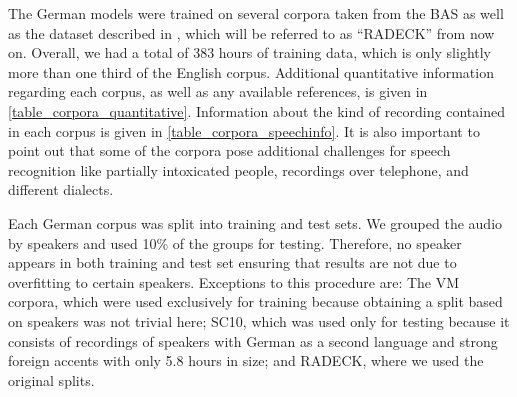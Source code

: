 \documentclass[11pt,a4paper]{article}
\begin{document}
The German models were trained on several corpora taken from the \ac{BAS} \cite{schiel_bas_1998, reichel_bas_2016} as well as the dataset described in \citet{radeck_corpus_2015}, which will be referred to as ``RADECK'' from now on.
Overall, we had a total of 383 hours of training data, which is only slightly more than one third of the English corpus.
Additional quantitative information regarding each corpus, as well as any available references, is given in \autoref{table_corpora_quantitative}.
Information about the kind of recording contained in each corpus is given in \autoref{table_corpora_speechinfo}.
It is also important to point out that some of the corpora pose additional challenges for speech recognition like partially intoxicated people, recordings over telephone, and different dialects.

Each German corpus was split into training and test sets.
We grouped the audio by speakers and used 10\% of the groups for testing.
Therefore, no speaker appears in both training and test set ensuring that results are not due to overfitting to certain speakers.
Exceptions to this procedure are: 
The VM corpora, which were used exclusively for training because obtaining a split based on speakers was not trivial here; 
SC10, which was used only for testing because it consists of recordings of speakers with German as a second language and strong foreign accents with only 5.8 hours in size;
and RADECK, where we used the original splits.
\end{document}

